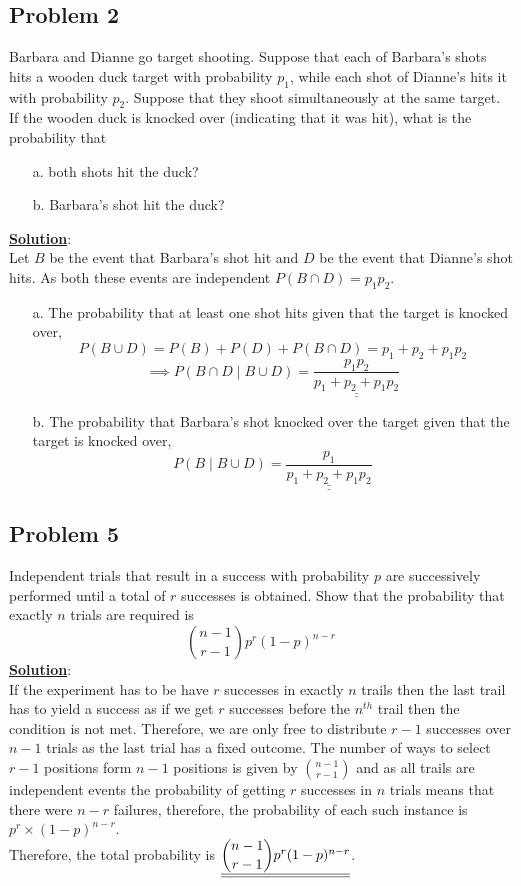 \documentclass[11pt,letter paper]{report}
\begin{document}
\subsection*{Problem 2}
Barbara and Dianne go target shooting. Suppose that each of Barbara's shots hits a wooden duck target with probability $p_1$, while each shot of Dianne's hits it with probability $p_2$. Suppose that they shoot simultaneously at the same target. If the wooden duck is knocked over (indicating that it was hit), what is the probability that
\begin{itemize}
\item[a.] both shots hit the duck?
\item[b.] Barbara's shot hit the duck?
\end{itemize}
{\bf \underline{Solution}}:\\
Let $B$ be the event that Barbara's shot hit and $D$ be the event that Dianne's shot hits. As both these events are independent $P(B\cap D)=p_1p_2$.
\begin{itemize}
\item[a.] The probability that at least one shot hits given that the target is knocked over, 
$$P(B\cup D)=P(B)+P(D)+P(B\cap D)=p_1+p_2+p_1p_2$$
$$\implies P(B\cap D\mid B\cup D)=\underline{\underline{\frac{p_1p_2}{p_1+p_2+p_1p_2}}}$$
\item[b.] The probability that Barbara's shot knocked over the target given that the target is knocked over,
$$P(B\mid B\cup D)=\underline{\underline{\frac{p_1}{p_1+p_2+p_1p_2}}}$$
\end{itemize}

\subsection*{Problem 5}
Independent trials that result in a success with probability $p$ are successively performed until a total of $r$ successes is obtained. Show that the probability that exactly $n$ trials are required is $$\binom{n-1}{r-1}p^r(1-p)^{n-r}$$
{\bf \underline{Solution}}:\\
If the experiment has to be have $r$ successes in exactly $n$ trails then the last trail has to yield a success as if we get $r$ successes before the $n^{th}$ trail then the condition is not met. Therefore, we are only free to distribute $r-1$ successes over $n-1$ trials as the last trial has a fixed outcome. The number of ways to select $r-1$ positions form $n-1$ positions is given by $\binom{n-1}{r-1}$ and as all trails are independent events the probability of getting $r$ successes in $n$ trials means that there were $n-r$ failures, therefore, the probability of each such instance is $p^r\times (1-p)^{n-r}$.\\
Therefore, the total probability is $\underline{\underline{\dbinom{n-1}{r-1}p^r(1-p)^{n-r}}}$.
\end{document}
